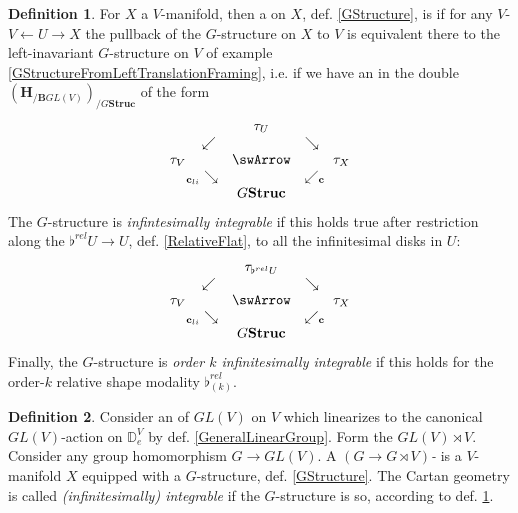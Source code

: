 \documentclass[12pt,titlepage]{article}
\def\mathllap{\mathpalette\mathllapinternal}
\def\mathrlap{\mathpalette\mathrlapinternal}
\def\mathllapinternal#1#2{\llap{$\mathsurround=0pt#1{#2}$}}
\def\mathrlapinternal#1#2{\rlap{$\mathsurround=0pt#1{#2}$}}
\newcommand{\itexarray}[1]{\begin{matrix}#1\end{matrix}}
\theoremstyle{plain}
\theoremstyle{definition}
\newtheorem{defn}{Definition}
\theoremstyle{remark}
\begin{document}
\begin{defn}
\label{IntegrabilityOfGStructure}\hypertarget{IntegrabilityOfGStructure}{}
For $X$ a $V$-manifold, then a  on $X$, def. \ref{GStructure}, is  if for any $V$- $V \leftarrow U \rightarrow X$ the pullback of the $G$-structure on $X$ to $V$ is equivalent there to the left-inavariant $G$-structure on $V$ of example \ref{GStructureFromLeftTranslationFraming}, i.e. if we have an  in the double  $(\mathbf{H}_{/\mathbf{B}GL(V)})_{/G\mathbf{Struc}}$ of the form
\begin{displaymath}
\itexarray{
&& \tau_U
\\
& \swarrow && \searrow
\\
\tau_V && \swArrow && \tau_X
\\
& {}_{\mathllap{\mathbf{c}_{li}}}\searrow && \swarrow_{\mathrlap{\mathbf{c}}}
\\
&& G \mathbf{Struc}
}
\end{displaymath}
The $G$-structure is \emph{infintesimally integrable} if this holds true after restriction along the  $\flat^{rel} U \to U$, def. \ref{RelativeFlat}, to all the infinitesimal disks in $U$:
\begin{displaymath}
\itexarray{
&& \tau_{\flat^{rel}U}
\\
& \swarrow && \searrow
\\
\tau_V && \swArrow && \tau_X
\\
& {}_{\mathllap{\mathbf{c}_{li}}}\searrow && \swarrow_{\mathrlap{\mathbf{c}}}
\\
&& G \mathbf{Struc}
}
\end{displaymath}
Finally, the $G$-structure is \emph{order $k$ infinitesimally integrable} if this holds for the order-$k$ relative shape modality $\flat^{rel}_{(k)}$.
\end{defn}
\begin{defn}
\label{CartanGeometry}\hypertarget{CartanGeometry}{}
Consider an  of $GL(V)$ on $V$ which linearizes to the canonical $GL(V)$-action on $\mathbb{D}^V_e$ by def. \ref{GeneralLinearGroup}. Form the  $GL(V) \rtimes V$. Consider any group homomorphism $G\to GL(V)$.
A \emph{$(G\to G\rtimes V)$-} is a $V$-manifold $X$ equipped with a $G$-structure, def. \ref{GStructure}. The Cartan geometry is called \emph{(infinitesimally) integrable} if the $G$-structure is so, according to def. \ref{IntegrabilityOfGStructure}.
\end{defn}
\end{document}
